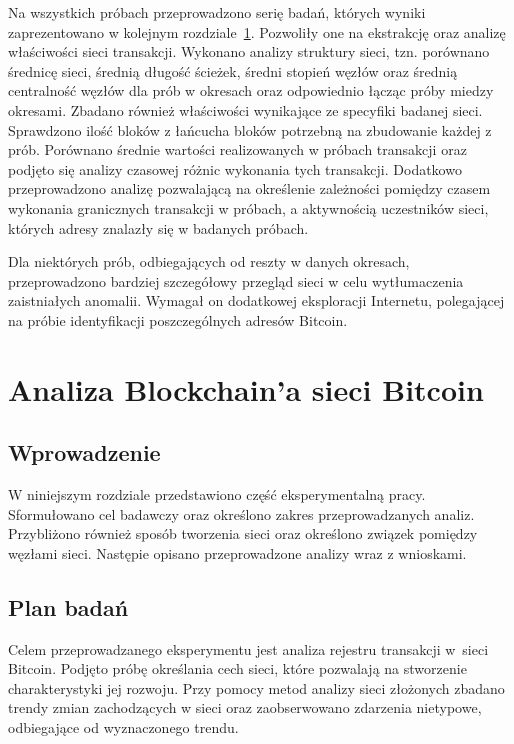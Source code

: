 \documentclass[12pt, twoside, final, openany]{mgr}
\begin{document}
\indent Na wszystkich próbach przeprowadzono serię badań, których wyniki zaprezentowano w kolejnym rozdziale~\ref{analizaBlockchain}. Pozwoliły one na ekstrakcję oraz analizę właściwości sieci transakcji. Wykonano analizy struktury sieci, tzn. porównano średnicę sieci, średnią długość ścieżek, średni stopień węzłów oraz średnią centralność węzłów dla prób w okresach oraz odpowiednio łącząc próby miedzy okresami. Zbadano również właściwości wynikające ze specyfiki badanej sieci. Sprawdzono ilość bloków z łańcucha bloków potrzebną na zbudowanie każdej z prób. Porównano średnie wartości realizowanych w próbach transakcji  oraz podjęto się analizy czasowej różnic wykonania tych transakcji. Dodatkowo przeprowadzono analizę pozwalającą na określenie zależności pomiędzy czasem wykonania granicznych transakcji w próbach, a aktywnością uczestników sieci, których adresy znalazły się w badanych próbach.

\indent Dla niektórych prób, odbiegających od reszty w danych okresach, przeprowadzono bardziej szczegółowy przegląd sieci w celu wytłumaczenia zaistniałych anomalii. Wymagał on dodatkowej eksploracji Internetu, polegającej na próbie identyfikacji poszczególnych adresów Bitcoin.


\chapter{Analiza Blockchain'a sieci Bitcoin}
\label{analizaBlockchain}
\section{Wprowadzenie}

\indent W niniejszym rozdziale przedstawiono część eksperymentalną pracy. Sformułowano cel badawczy oraz określono zakres przeprowadzanych analiz. Przybliżono również sposób tworzenia sieci oraz określono związek pomiędzy węzłami sieci. Następie opisano przeprowadzone analizy wraz z wnioskami.

\section{Plan badań}

\indent Celem przeprowadzanego eksperymentu jest analiza rejestru transakcji w~sieci Bitcoin. Podjęto próbę określania cech sieci, które pozwalają na stworzenie charakterystyki jej rozwoju. Przy pomocy metod analizy sieci złożonych zbadano trendy zmian zachodzących w sieci oraz zaobserwowano zdarzenia nietypowe, odbiegające od wyznaczonego trendu. 
\end{document}
